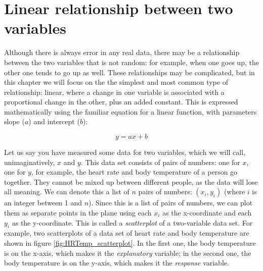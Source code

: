 \documentclass[
  letterpaper,
  DIV=11,
  numbers=noendperiod]{scrreprt}
\newenvironment{Shaded}{\begin{snugshade}}{\end{snugshade}}
\newcommand{\AttributeTok}[1]{\textcolor[rgb]{0.40,0.45,0.13}{#1}}
\newcommand{\ConstantTok}[1]{\textcolor[rgb]{0.56,0.35,0.01}{#1}}
\newcommand{\FloatTok}[1]{\textcolor[rgb]{0.68,0.00,0.00}{#1}}
\newcommand{\FunctionTok}[1]{\textcolor[rgb]{0.28,0.35,0.67}{#1}}
\newcommand{\NormalTok}[1]{\textcolor[rgb]{0.00,0.23,0.31}{#1}}
\newcommand{\OtherTok}[1]{\textcolor[rgb]{0.00,0.23,0.31}{#1}}
\newcommand{\SpecialCharTok}[1]{\textcolor[rgb]{0.37,0.37,0.37}{#1}}
\newcommand{\StringTok}[1]{\textcolor[rgb]{0.13,0.47,0.30}{#1}}
\begin{document}
\hypertarget{linear-relationship-between-two-variables}{%
\section{Linear relationship between two
variables}\label{linear-relationship-between-two-variables}}

\label{sec:model8}

Although there is always error in any real data, there may be a
relationship between the two variables that is not random: for example,
when one goes up, the other one tends to go up as well. These
relationships may be complicated, but in this chapter we will focus on
the the simplest and most common type of relationship: linear, where a
change in one variable is associated with a proportional change in the
other, plus an added constant. This is expressed mathematically using
the familiar equation for a linear function, with parameters slope
(\(a\)) and intercept (\(b\)):

\[ y = ax + b\]

Let us say you have measured some data for two variables, which we will
call, unimaginatively, \(x\) and \(y\). This data set consists of pairs
of numbers: one for \(x\), one for \(y\), for example, the heart rate
and body temperature of a person go together. They cannot be mixed up
between different people, as the data will lose all meaning. We can
denote this a list of \(n\) pairs of numbers: \((x_i, y_i)\) (where
\(i\) is an integer between 1 and \(n\)). Since this is a list of pairs
of numbers, we can plot them as separate points in the plane using each
\(x_i\) as the x-coordinate and each \(y_i\) as the y-coordinate. This
is called a  \emph{scatterplot} of a two-variable
data set. For example, two scatterplots of a data set of heart rate and
body temperature are shown in figure \ref{fig:HRTemp_scatterplot}. In
the first one, the body temperature is on the x-axis, which makes it the
 \emph{explanatory} variable; in the second
one, the body temperature is on the y-axis, which makes it the
 \emph{response} variable.

\begin{Shaded}
\end{Shaded}
\end{document}
